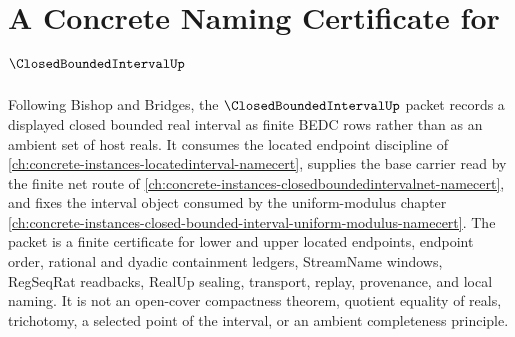 \chapter{A Concrete Naming Certificate for $\ClosedBoundedIntervalUp$}
\label{ch:concrete-instances-closedboundedinterval-namecert}

Following Bishop and Bridges, the $\ClosedBoundedIntervalUp$ packet records a displayed closed bounded real interval as finite BEDC rows rather than as an ambient set of host reals. It consumes the located endpoint discipline of \autoref{ch:concrete-instances-locatedinterval-namecert}, supplies the base carrier read by the finite net route of \autoref{ch:concrete-instances-closedboundedintervalnet-namecert}, and fixes the interval object consumed by the uniform-modulus chapter \autoref{ch:concrete-instances-closed-bounded-interval-uniform-modulus-namecert}. The packet is a finite certificate for lower and upper located endpoints, endpoint order, rational and dyadic containment ledgers, StreamName windows, RegSeqRat readbacks, RealUp sealing, transport, replay, provenance, and local naming. It is not an open-cover compactness theorem, quotient equality of reals, trichotomy, a selected point of the interval, or an ambient completeness principle.


